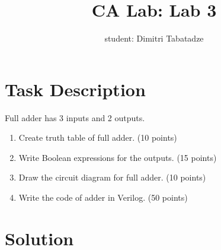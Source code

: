 \documentclass{article}
\title{CA Lab: Lab 3}
\author{student: Dimitri Tabatadze}
\begin{document}
    \maketitle

    \section*{Task Description}

    Full adder has 3 inputs and 2 outputs. 
    
    \begin{enumerate}[label={\alph*}]
        \item {Create truth table of full adder. (10 points)}
        \item {Write Boolean expressions for the outputs. (15 points)}
        \item {Draw the circuit diagram for full adder. (10 points)}
        \item {Write the code of adder in Verilog. (50 points)}
    \end{enumerate}

    \section*{Solution}
    
\end{document}
